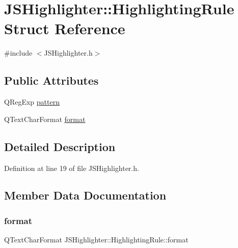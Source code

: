\hypertarget{struct_j_s_highlighter_1_1_highlighting_rule}{}\section{J\+S\+Highlighter\+:\+:Highlighting\+Rule Struct Reference}
\label{struct_j_s_highlighter_1_1_highlighting_rule}


{\ttfamily \#include $<$J\+S\+Highlighter.\+h$>$}

\subsection*{Public Attributes}
\begin{DoxyCompactItemize}
\item 
Q\+Reg\+Exp \hyperlink{struct_j_s_highlighter_1_1_highlighting_rule_a21244028be3616d0a10cbed6f4bf192c}{pattern}
\item 
Q\+Text\+Char\+Format \hyperlink{struct_j_s_highlighter_1_1_highlighting_rule_aee2fb3598a602014fd7e9e2ab31f05e1}{format}
\end{DoxyCompactItemize}


\subsection{Detailed Description}


Definition at line 19 of file J\+S\+Highlighter.\+h.



\subsection{Member Data Documentation}
\mbox{\label{struct_j_s_highlighter_1_1_highlighting_rule_aee2fb3598a602014fd7e9e2ab31f05e1}} 
\subsubsection{\texorpdfstring{format}{format}}
{\footnotesize\ttfamily Q\+Text\+Char\+Format J\+S\+Highlighter\+::\+Highlighting\+Rule\+::format}




